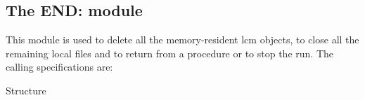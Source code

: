 \clearpage

\subsection{The END: module}\label{sect:ENDData}

This module is used to delete all the memory-resident {\sc lcm} objects, to close all  the
remaining local files and to return from a procedure or to stop the run. The
calling specifications are:

\vskip -0.2cm

\begin{DataStructure}{Structure }
  \moc{;}
\end{DataStructure}
